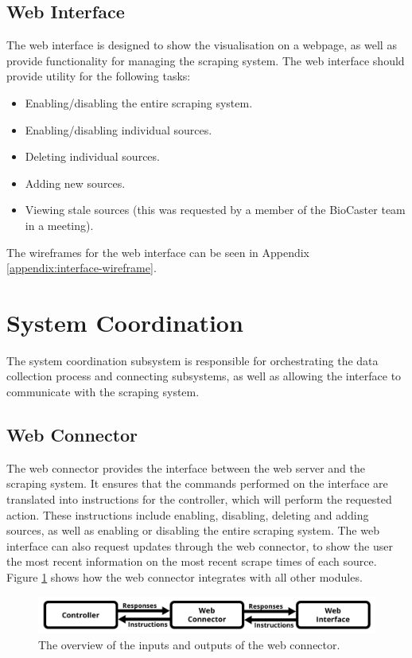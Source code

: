 \documentclass{l4proj}
\begin{document}
\subsection{Web Interface}
The web interface is designed to show the visualisation on a webpage, as well as provide functionality for managing the scraping system. The web interface should provide utility for the following tasks:
\begin{itemize}
    \item Enabling/disabling the entire scraping system.
    \item Enabling/disabling individual sources.
    \item Deleting individual sources.
    \item Adding new sources.
    \item Viewing stale sources (this was requested by a member of the BioCaster team in a meeting).
\end{itemize}
The wireframes for the web interface can be seen in Appendix \ref{appendix:interface-wireframe}.

\section{System Coordination}
The system coordination subsystem is responsible for orchestrating the data collection process and connecting subsystems, as well as allowing the interface to communicate with the scraping system.
\subsection{Web Connector}
The web connector provides the interface between the web server and the scraping system. It ensures that the commands performed on the interface are translated into instructions for the controller, which will perform the requested action. These instructions include enabling, disabling, deleting and adding sources, as well as enabling or disabling the entire scraping system. The web interface can also request updates through the web connector, to show the user the most recent information on the most recent scrape times of each source. Figure \ref{fig:web-connector-diagram} shows how the web connector integrates with all other modules.
 \begin{figure}[h]
\centering
\includegraphics[width=\textwidth]{images/Web-connector-diagram.png}
\caption{The overview of the inputs and outputs of the web connector.}
\label{fig:web-connector-diagram}
\end{figure}
\end{document}
